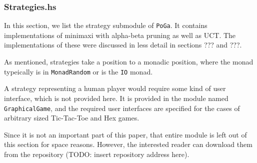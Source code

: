 \subsubsection {Strategies.hs}

In this section, we list the strategy submodule of \texttt{PoGa}.
It contains implementations of minimaxi with alpha-beta pruning as well as UCT.
The implementations of these were discussed in less detail in sections ??? and ???.


As mentioned, strategies take a position to a monadic position, where the monad typeically is in \texttt{MonadRandom} or is the \texttt{IO} monad.

A strategy representing a human player would require some kind of user interface, which is not provided here.
It is provided in the module named \texttt{GraphicalGame}, and the required user interfaces are specified for the cases of arbitrary sized Tic-Tac-Toe and Hex games.

Since it is not an important part of this paper, that entire module is left out of this section for space reasons.
However, the interested reader can download them from the repository (TODO: insert repository address here).




